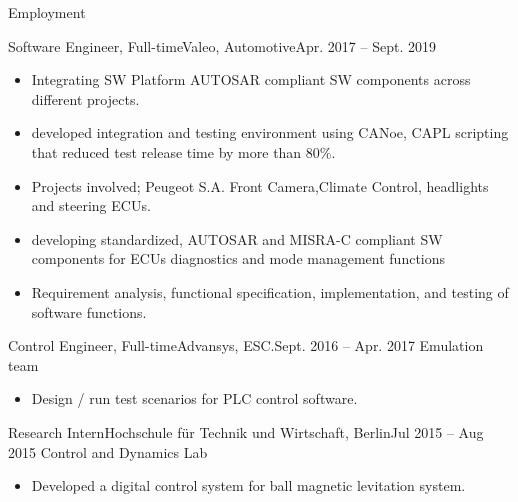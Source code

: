 \documentclass[]{mcdowellcv}
\begin{document}
\begin{cvsection}{Employment}
		\begin{cvsubsection}{Software Engineer, Full-time}{Valeo, Automotive}{Apr. 2017 -- Sept. 2019}	
			\begin{itemize}
				\item Integrating SW Platform AUTOSAR compliant SW components across different projects.
				\item developed integration and testing environment using CANoe, CAPL scripting that reduced test release time by more than 80\%.
				\item Projects involved; Peugeot S.A. Front Camera,Climate Control, headlights and steering ECUs.
				\item developing standardized, AUTOSAR and MISRA-C compliant SW components for ECUs diagnostics and mode management functions
				\item Requirement analysis, functional specification, implementation, and testing of software functions.
			\end{itemize}
			
		\end{cvsubsection}
		
		\begin{cvsubsection}{Control Engineer, Full-time}{Advansys, ESC.}{Sept. 2016 -- Apr. 2017}
			Emulation team
			\begin{itemize}
				\item Design / run test scenarios for PLC control software.
			\end{itemize}
		\end{cvsubsection}
		
		\begin{cvsubsection}{Research Intern}{Hochschule für Technik und Wirtschaft, Berlin}{Jul 2015 -- Aug 2015}
			Control and Dynamics Lab		
			\begin{itemize}
				\item Developed a digital control system for ball magnetic levitation system.
			\end{itemize}
		\end{cvsubsection}
		
	\end{cvsection}
	
\end{document}
